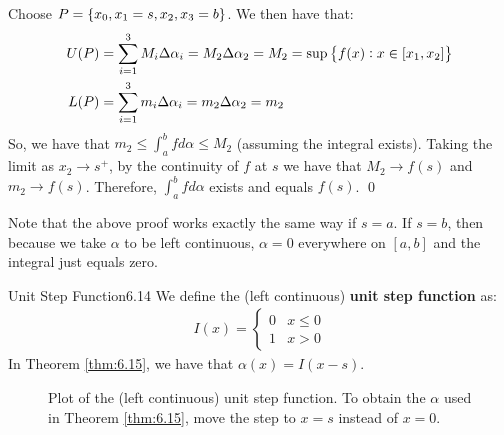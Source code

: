 \begin{nproof}
    Choose $P = \set{x_0, x_1 = s, x_2, x_3 = b}$. We then have that:
    \begin{align*}
        U(P) &= \sum_{i=1}^3M_i\Delta \alpha_i = M_2\Delta \alpha_2 = M_2 = \sup\set{f(x): x \in [x_1, x_2]}
        \\ L(P) &= \sum_{i=1}^3 m_i \Delta \alpha_i = m_2\Delta \alpha_2 = m_2
    \end{align*}
    So, we have that $m_2 \leq \int_a^b f d\alpha \leq M_2$ (assuming the integral exists). Taking the limit as $x_2 \rightarrow s^+$, by the continuity of $f$ at $s$ we have that $M_2 \rightarrow f(s)$ and $m_2 \rightarrow f(s)$. Therefore, $\int_a^b f d\alpha$ exists and equals $f(s)$. \qed
\end{nproof}
\noindent Note that the above proof works exactly the same way if $s = a$. If $s = b$, then because we take $\alpha$ to be left continuous, $\alpha = 0$ everywhere on $[a, b]$ and the integral just equals zero.

\setcounter{rudin}{13}
\begin{definition}{Unit Step Function}{6.14}
    We define the (left continuous) \textbf{unit step function} as:
    \begin{align*}
        I(x) = \begin{cases}
            0 & x \leq 0
            \\ 1 & x > 0
        \end{cases}
    \end{align*}
    In Theorem \ref{thm:6.15}, we have that $\alpha(x) = I(x - s)$. 
\end{definition}
\begin{figure}[htbp]
    \centering
    
    \caption{Plot of the (left continuous) unit step function. To obtain the $\alpha$ used in Theorem \ref{thm:6.15}, move the step to $x = s$ instead of $x = 0$.}
    \label{fig33}
\end{figure}

